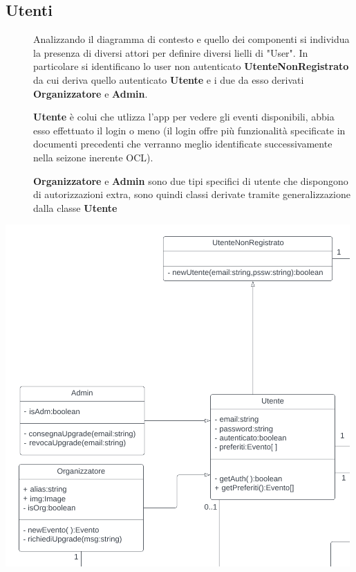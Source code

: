 \documentclass{article}
\begin{document}
\subsection{Utenti}
\begin{description}
    \item[] Analizzando il diagramma di contesto e quello dei componenti si individua la presenza di diversi attori per definire diversi lielli di "User". In particolare si identificano lo user non autenticato \textbf{UtenteNonRegistrato} da cui deriva quello autenticato \textbf{Utente} e i due da esso derivati \textbf{Organizzatore} e \textbf{Admin}.
    \item[] \textbf{Utente} è colui che utlizza l'app per vedere gli eventi disponibili, abbia esso effettuato il login o meno (il login offre più funzionalità specificate in documenti precedenti che verranno meglio identificate successivamente nella seizone inerente OCL).
    \item[] \textbf{Organizzatore} e \textbf{Admin} sono due tipi specifici di utente che dispongono di autorizzazioni extra, sono quindi classi derivate tramite generalizzazione dalla classe \textbf{Utente}
\end{description}
\begin{center}
    \item[] \includegraphics[scale=0.7]{utenti.png}
\end{center}
\newpage
\end{document}
